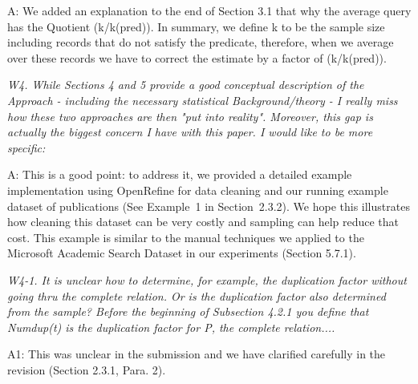 A: %
We added an explanation to the end of Section 3.1 that why the average query has the Quotient (k/k(pred)). In summary, we define k to be the sample size including records that do not satisfy the predicate, therefore, when we average over these records we have to correct the estimate by a factor of (k/k(pred)). 


\mbox{}

\emph{W4. While Sections 4 and 5 provide a good conceptual description of the Approach - including the necessary statistical Background/theory - I really miss how these two approaches are then "put into reality". Moreover, this gap is actually the biggest concern I have with this paper. I would like to be more specific:}

A: This is a good point: to address it, we provided a detailed example implementation using OpenRefine for data cleaning and our running example dataset of publications (See Example~1 in Section~2.3.2).  We hope this illustrates how cleaning this dataset can be very costly and sampling can help reduce that cost. 
This example is similar to the manual techniques we applied to the Microsoft Academic Search Dataset in our experiments (Section 5.7.1).
\vspace{1em}

\emph{W4-1. It is unclear how to determine, for example, the duplication factor without going thru the complete relation. Or is the duplication factor also determined from the sample? Before the beginning of Subsection 4.2.1 you define that Numdup(t) is the duplication factor for P, the complete relation.... }

A1: %
%
%
This was unclear in the submission and we have clarified carefully in the revision (Section 2.3.1, Para. 2).

